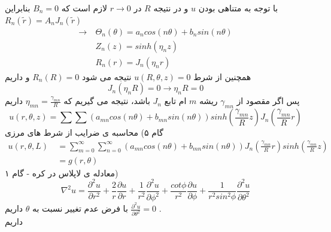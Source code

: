 با توجه به متناهی بودن
$u$
و در نتیجه
$R$
در
$r\to 0$
لازم است که
$B_n=0$
بنابراین
$R_n\left(\tilde{r}\right)=A_nJ_n\left(\tilde{r}\right)$
\begin{equation*}
	\begin{aligned}
		\rightarrow {} &\
		\Theta_{n}(\theta)=a_n cos(n\theta)+b_n sin(n\theta)
		\\ &\
		Z_n(z)=sinh \left(\eta_nz\right)
		\\ &\
		R_n(r)=J_n\left(\eta_nr\right)
	\end{aligned}
\end{equation*}
همچنین از شرط
$u(R,\theta,z)=0$
نتیجه می شود
$R_n(R)=0$
و داریم
\[
J_n\left(\eta_nR\right)=0\rightarrow \eta_n R=0
\]
پس اگر مقصود از 
$\gamma_{mn}$
ریشه
$m$
ام تابع 
$J_n$
باشد، نتیجه می گیریم که
$
\eta_{mn}=\frac{\gamma_{mn}}{R}
$
داریم
\[
u(r,\theta,z)=\sum\sum \left(a_{mn}cos(n\theta)+b_{mn}sin(n\theta)\right) sinh\left(\frac{\gamma_{mn}}{R}z\right)J_n\left(\frac{\gamma_{mn}}{R}r\right)
\]
گام  ۵) محاسبه ی ضرایب از شرط های مرزی
\begin{equation*}
	\begin{aligned}
		u(r,\theta,L) {} &\
		=\sum_{m=0}^\infty{\sum_{n=0}^\infty{\left(a_{mn}cos(n\theta)+b_{mn}sin(n\theta)\right) J_n\left(\frac{\gamma_{mn}}{R}r\right)sinh\left(\frac{\gamma_{mn}}{R}z\right)}}
		\\ &\
		=g(r,\theta)
	\end{aligned}
\end{equation*}
معادله ی لاپلاس در کره - گام ۱)
\[
\nabla^2 u = \frac{\partial^2 u}{\partial r^2}+\frac{2}{r}\frac{\partial u}{\partial r}+\frac{1}{r^2}\frac{\partial^2 u}{\partial \phi^2}+\frac{cot \phi}{r^2}\frac{\partial u}{\partial \phi}+\frac{1}{r^2 sin^2 \phi}\frac{\partial^2 u}{\partial \theta^2}
\]
با فرض عدم تغییر نسبت به 
$\theta$
داریم
$\frac{\partial^2 u}{\partial \theta^2}=0$
.\\
داریم
